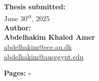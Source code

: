 \vspace{5ex}

\noindent\makebox[\linewidth]{{\rule{0.8\paperwidth}{4pt}}}

\vspace{5ex}


\begin{minipage}[t]{0.485\textwidth}
\begin{flushleft}


\textbf{Thesis submitted:} \\[5pt]\hspace{2ex}
June 30\textsuperscript{st}, 2025
\\[5pt]
\textbf{Author:} \\[2pt]\hspace*{2ex}
\textbf{Abdelhakim Khaled Amer} \\\hspace*{2ex}
\href{mailto:olaya@ece.au.dk}{abdelhakim@ece.au.dk}\\\hspace*{2ex}
\href{mailto:oat@eiva.com}{abdelhakim@aucegypt.edu}\\\hspace*{2ex}

\textbf{Pages: -} \\
\end{flushleft}
\end{minipage}
\hfill
